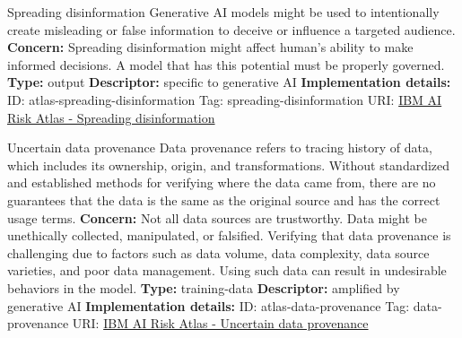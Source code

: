\begin{definitionbox}{Spreading disinformation}
Generative AI models might be used to intentionally create misleading or false information to deceive or influence a targeted audience.\newline\newline
\textbf{Concern: }Spreading disinformation might affect human's ability to make informed decisions. A model that has this potential must be properly governed.\newline\newline
\textbf{Type: }output\newline
\textbf{Descriptor: }specific to generative AI \newline\newline
\textbf{Implementation details: } \newline
ID: atlas-spreading-disinformation \newline
Tag: spreading-disinformation \newline
URI:  \href{https://www.ibm.com/docs/en/watsonx/saas?topic=SSYOK8/wsj/ai-risk-atlas/spreading-disinformation.html}{IBM AI Risk Atlas - Spreading disinformation}\newline
\end{definitionbox}
\begin{definitionbox}{Uncertain data provenance}
Data provenance refers to tracing history of data, which includes its ownership, origin, and transformations. Without standardized and established methods for verifying where the data came from, there are no guarantees that the data is the same as the original source and has the correct usage terms.\newline\newline
\textbf{Concern: }Not all data sources are trustworthy. Data might be unethically collected, manipulated, or falsified. Verifying that data provenance is challenging due to factors such as data volume, data complexity, data source varieties, and poor data management. Using such data can result in undesirable behaviors in the model.\newline\newline
\textbf{Type: }training-data\newline
\textbf{Descriptor: }amplified by generative AI \newline\newline
\textbf{Implementation details: } \newline
ID: atlas-data-provenance \newline
Tag: data-provenance \newline
URI:  \href{https://www.ibm.com/docs/en/watsonx/saas?topic=SSYOK8/wsj/ai-risk-atlas/data-provenance.html}{IBM AI Risk Atlas - Uncertain data provenance}\newline
\end{definitionbox}
